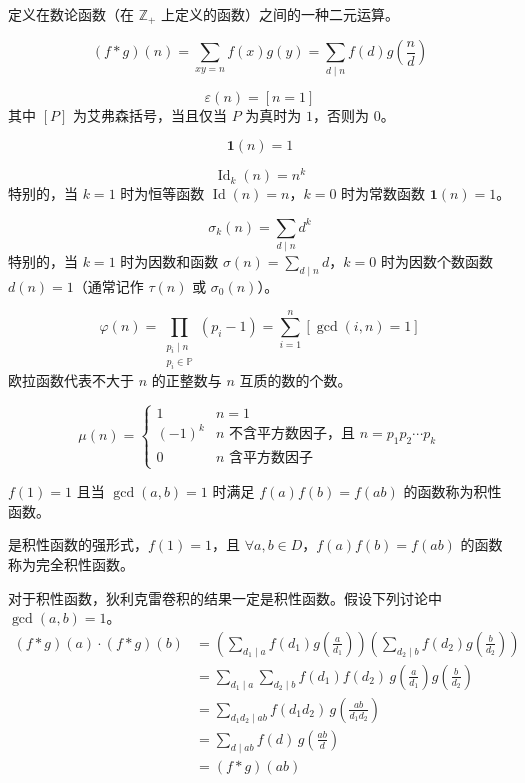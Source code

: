 定义在数论函数（在 $\mathbb{Z_+}$ 上定义的函数）之间的一种二元运算。

\[
(f * g)(n) = \sum_{xy=n} f(x)g(y) = \sum_{d \mid n} f(d)g\!\left(\frac{n}{d}\right)
\]


\[
\varepsilon(n) = [n = 1]
\]
其中 $[P]$ 为艾弗森括号，当且仅当 $P$ 为真时为 $1$，否则为 $0$。

\[
\mathbf{1}(n) = 1
\]

\[
\operatorname{Id}_k(n) = n^k
\]
特别的，当 $k = 1$ 时为恒等函数 $\operatorname{Id}(n) = n$，$k = 0$ 时为常数函数 $\mathbf{1}(n) = 1$。

\[
\sigma_k(n) = \sum_{d\mid n} d^{k}
\]
特别的，当 $k = 1$ 时为因数和函数 $\sigma(n) = \sum_{d\mid n} d$，$k = 0$ 时为因数个数函数 $d(n) = 1$（通常记作 $\tau(n)$ 或 $\sigma_0(n)$）。

\[
\varphi(n) = \prod_{\substack{p_i \mid n \\ p_i \in \mathbb{P}}} (p_i - 1) = \sum_{i=1}^{n} [\gcd(i, n)=1]
\]
欧拉函数代表不大于 $n$ 的正整数与 $n$ 互质的数的个数。

\[
\mu(n) = 
\begin{cases}
1 & n = 1 \\
(-1)^k & n \text{ 不含平方数因子，且 } n = p_1 p_2 \cdots p_k \\
0 & n \text{ 含平方数因子}
\end{cases}
\]


$f(1) = 1$ 且当 $\gcd(a, b) = 1$ 时满足 $f(a)f(b) = f(ab)$ 的函数称为积性函数。

是积性函数的强形式，$f(1) = 1$，且 $\forall a, b \in D$，$f(a)f(b) = f(ab)$ 的函数称为完全积性函数。


对于积性函数，狄利克雷卷积的结果一定是积性函数。假设下列讨论中 $\gcd(a, b) = 1$。
\[
\begin{aligned}
(f * g)(a) \cdot (f * g)(b) 
&= \left( \sum_{d_1 \mid a} f(d_1)g\!\left(\frac{a}{d_1}\right) \right)
   \left( \sum_{d_2 \mid b} f(d_2) g\!\left(\frac{b}{d_2}\right) \right) \\
&= \sum_{d_1 \mid a}\sum_{d_2 \mid b} f(d_1)f(d_2)\, g\!\left(\frac{a}{d_1}\right) g\!\left(\frac{b}{d_2}\right) \\
&= \sum_{d_1d_2 \mid ab} f(d_1 d_2)\, g\!\left(\frac{ab}{d_1 d_2}\right) \\
&= \sum_{d \mid ab} f(d)\, g\!\left(\frac{ab}{d}\right) \\
&= (f * g)(ab)
\end{aligned}
\]

